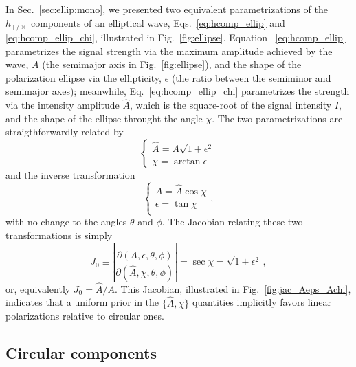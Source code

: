 \documentclass[aps,prd,twocolumn,superscriptaddress,preprintnumbers,floatfix,nofootinbib]{revtex4-2}
\begin{document}
In Sec.~\ref{sec:ellip:mono}, we presented two equivalent parametrizations of the $h_{+/\times}$ components of an elliptical wave, Eqs.~\eqref{eq:hcomp_ellip} and \eqref{eq:hcomp_ellip_chi}, illustrated in Fig.~\ref{fig:ellipse}.
Equation ~\eqref{eq:hcomp_ellip} parametrizes the signal strength via the maximum amplitude achieved by the wave, $A$ (the semimajor axis in Fig.~\ref{fig:ellipse}), and the shape of the polarization ellipse via the ellipticity, $\epsilon$ (the ratio between the semiminor and semimajor axes);
meanwhile, Eq.~\eqref{eq:hcomp_ellip_chi} parametrizes the strength via the intensity amplitude $\hat{A}$, which is the square-root of the signal intensity $I$, and the shape of the ellipse throught the angle $\chi$.
The two parametrizations are straigthforwardly related by
\begin{equation} \label{eq:Aellip_Ahatchi}
\begin{cases}
\hat{A} = A \sqrt{1 + \epsilon^2} \\
\chi = \arctan \epsilon 
\end{cases} 
\end{equation}
and the inverse transformation
\begin{equation} \label{eq:Ahatchi_Aellip}
\begin{cases}
A = \hat{A} \cos \chi \\
\epsilon = \tan \chi \\
\end{cases} ,
\end{equation}
with no change to the angles $\theta$ and $\phi$.
The Jacobian relating these two transformations is simply
\begin{equation} \label{eq:jac_Aeps_Achi}
J_0 \equiv \left| \frac{\partial(A,\epsilon,\theta,\phi)}{\partial(\hat{A}, \chi, \theta, \phi)}\right| =  \sec \chi = \sqrt{1 + \epsilon^2} \, ,
\end{equation}
or, equivalently $J_0 = \hat{A}/A$.
This Jacobian, illustrated in Fig.~\ref{fig:jac_Aeps_Achi}, indicates that a uniform prior in the $\{\hat{A}, \chi\}$ quantities implicitly favors linear polarizations relative to circular ones.

\subsection{Circular components}
\label{sec:jac:Arl}
\end{document}
